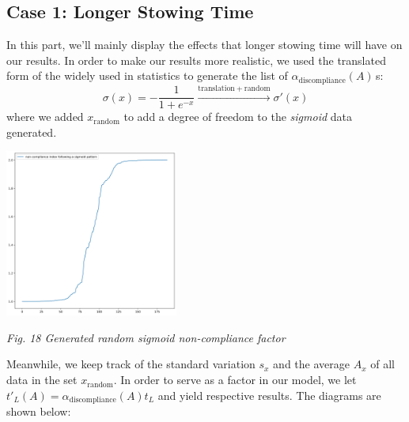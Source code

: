 \documentclass{article}
\theoremstyle{definition}
\theoremstyle{remark}
\numberwithin{equation}{section}
\begin{document}
	\subsection{Case 1: Longer Stowing Time}
	In this part, we'll mainly display the effects that longer stowing time will have on our results. In order to make our results more realistic, we used the translated form of the  widely used in statistics to generate the list of $\alpha_\text{discompliance}(A)\,$s:
	\[\sigma \left( x \right) =-\frac{1}{1+e^{-x}}\xrightarrow{\mathrm{translation}+\mathrm{random}}\sigma '\left( x \right)  \]
	where we added \(x_{\mathrm{random}}\) to add a degree of freedom to the \textit{sigmoid} data generated.
	\begin{center}
		\includegraphics[height = 5.5cm]{sigmoid non compliance.png}

		\small\textit{Fig. 18 Generated random sigmoid non-compliance factor}
	\end{center}
	Meanwhile, we keep track of the standard variation \(s_x\) and the average \(A_x\) of all data in the set \(x_{\mathrm{random}}\). In order to serve as a  factor in our model, we let \(t'_L(A) = \alpha_\text{discompliance}(A)t_L\) and yield respective results. The diagrams are shown below:
\end{document}
